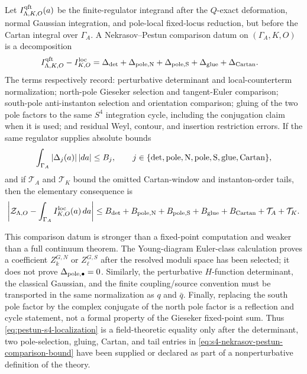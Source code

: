 Let \(I_{\Lambda,K,O}^{\rm qft}(a)\) be the finite-regulator integrand after
the \(Q\)-exact deformation, normal Gaussian integration, and pole-local
fixed-locus reduction, but before the Cartan integral over \(\Gamma_A\).  A
Nekrasov--Pestun comparison datum on \((\Gamma_A,K,O)\) is a
decomposition
\[
\begin{aligned}
  I_{\Lambda,K,O}^{\rm qft}
  -I_{K,O}^{\rm loc}
  &=
  \Delta_{\rm det}
  +\Delta_{\rm pole,N}
  +\Delta_{\rm pole,S}
  +\Delta_{\rm glue}
  +\Delta_{\rm Cartan}.
\end{aligned}
\]
The terms respectively record: perturbative determinant and local-counterterm
normalization; north-pole Gieseker selection and tangent-Euler comparison;
south-pole anti-instanton selection and orientation comparison; gluing of the
two pole factors to the same \(S^4\) integration cycle, including the
conjugation claim when it is used; and residual Weyl, contour, and insertion
restriction errors.  If the same regulator supplies absolute bounds
\[
  \int_{\Gamma_A}|\Delta_j(a)|\,|da|\le B_j,
  \qquad
  j\in\{{\rm det},{\rm pole,N},{\rm pole,S},{\rm glue},{\rm Cartan}\},
\]
and if \(\mathcal T_A\) and \(\mathcal T_K\) bound the omitted Cartan-window
and instanton-order tails, then the elementary consequence is
\begin{equation}
  \left|
  \mathcal Z_{\Lambda,O}
  -
  \int_{\Gamma_A}I_{K,O}^{\rm loc}(a)\,da
  \right|
  \le
  B_{\rm det}+B_{\rm pole,N}+B_{\rm pole,S}
  +B_{\rm glue}+B_{\rm Cartan}
  +\mathcal T_A+\mathcal T_K .
  \label{eq:s4-nekrasov-pestun-comparison-bound}
\end{equation}

This comparison datum is stronger than a fixed-point computation and weaker than a
full continuum theorem.  The Young-diagram Euler-class calculation proves a
coefficient \(Z_k^{G,N}\) or \(Z_\ell^{G,S}\) after the resolved moduli space
has been selected; it does not prove \(\Delta_{\rm pole,\bullet}=0\).
Similarly, the perturbative \(H\)-function determinant, the classical
Gaussian, and the finite coupling/source convention must be transported in the
same normalization as \(q\) and \(\bar q\).  Finally, replacing the south pole
factor by the complex conjugate of the north pole factor is a reflection and
cycle statement, not a formal property of the Gieseker fixed-point sum.  Thus
\eqref{eq:pestun-s4-localization} is a field-theoretic equality only after the
determinant, two pole-selection, gluing, Cartan, and tail entries in
\eqref{eq:s4-nekrasov-pestun-comparison-bound} have been supplied or declared
as part of a nonperturbative definition of the theory.

